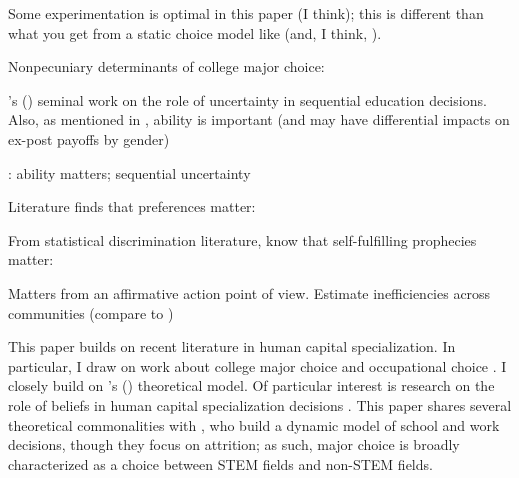\documentclass[11 pt]{article}
\newcommand{\toedit}[1]{{\color{gray}#1}}
\newcommand{\toedit}[1]{#1}
\newcommand{\citeposs}[1]{{\citeauthor{#1}'s (\citeyear{#1})}}
\begin{document}
\textcite{AF20}
\begin{blist}
\item Some experimentation is optimal in this paper (I think); this is different than what you get from a static choice model like \textcite{Z13} (and, I think, \textcite{A93}).
\end{blist}
Nonpecuniary determinants of college major choice:
\begin{blist}
\item \citeposs{A93} seminal work on the role of uncertainty in sequential education decisions. Also, as mentioned in \textcite{Z13}, ability is important \toedit{(and may have differential impacts on ex-post payoffs by gender)}
\item \textcite{A04}: ability matters; sequential uncertainty
\item Literature finds that preferences matter: \textcite{Z13}
\end{blist}
From statistical discrimination literature, know that self-fulfilling prophecies matter:
\begin{blist}
\item \textcite{CL93}
\end{blist}
Matters from an affirmative action point of view. Estimate inefficiencies across communities (compare to \textcite{AL16})






This paper builds on recent literature in human capital specialization.
In particular, I draw on work about college major choice and occupational choice \parencite{ABM12,AAM16-education}.
I closely build on \citeposs{AF20} theoretical model.
Of particular interest is research on the role of beliefs in human capital specialization decisions \parencite{AHMR-wp}.
This paper shares several theoretical commonalities with \textcite{AAMR16-wp}, who build a dynamic model of school and work decisions, though they focus on attrition; as such, major choice is broadly characterized as a choice between STEM fields and non-STEM fields. 
\end{document}
